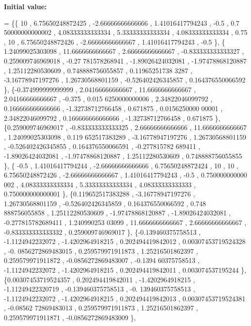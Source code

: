 {\bfseries Initial value\+:}
\begin{DoxyCode}
= \{\{               10 ,  6.75650248872425 , -2.66666666666666 ,  1.41016417794243 ,              -0.5 , 0.7
      50000000000002 ,  4.08333333333334 ,  5.33333333333334 ,  4.08333333333334 ,              0.75 ,            
          10 ,  6.75650248872426 , -2.66666666666667 ,  1.41016417794243 ,              -0.5 \},
\{ 1.24099025303098 ,  11.6666666666667 ,  2.66666666666667 , -0.833333333333327 , 0.259009746969018 , -0.27
      781578268941 , -1.89026424032081 , -1.97478868120887 ,  1.25112280530609 , 0.748888756055857 , 0.11965251738
      3287 , -3.16778947197276 ,  1.26730568801159 , -0.526402426345857 , 0.164376550066592 \},
\{-0.374999999999999 ,  2.04166666666667 ,  11.6666666666667 ,  2.04166666666667 ,            -0.375 , 0.015
      6250000000006 ,  2.34822046099792 , 0.166666666666666 , -1.32738712766458 ,          0.671875 , 0.0156250000
      00001 ,  2.34822046099792 , 0.166666666666666 , -1.32738712766458 ,          0.671875 \},
\{0.259009746969017 , -0.833333333333325 ,  2.66666666666666 ,  11.6666666666667 ,  1.24099025303098 , 0.119
      652517383289 , -3.16778947197276 ,  1.26730568801159 , -0.526402426345855 , 0.164376550066591 , -0.277815782
      689411 , -1.89026424032081 , -1.97478868120887 ,  1.25112280530609 , 0.748888756055855 \},
\{             -0.5 ,  1.41016417794244 , -2.66666666666666 ,  6.75650248872424 ,                10 ,       
               10 ,  6.75650248872426 , -2.66666666666667 ,  1.41016417794243 ,              -0.5 , 0.750000000000
      002 ,  4.08333333333334 ,  5.33333333333334 ,  4.08333333333333 , 0.750000000000001 \},
\{0.119652517383288 , -3.16778947197276 ,  1.26730568801159 , -0.526402426345859 , 0.164376550066592 , 0.748
      888756055858 ,  1.25112280530609 , -1.97478868120887 , -1.89026424032081 , -0.277815782689411 ,  1.240990253
      03099 ,  11.6666666666667 ,  2.66666666666667 , -0.833333333333332 , 0.259009746969017 \},
\{-0.139460375758513 ,  -1.1124942232072 ,  -1.4202964918215 , 0.202494419842012 , 0.00307453719524328 , -0.
      0856272869483015 , 0.259579971911873 ,  1.25216501862397 , 0.259579971911872 , -0.0856272869483007 , -0.1394
      60375758513 ,  -1.1124942232072 ,  -1.4202964918215 , 0.202494419842011 , 0.003074537195244 \},
\{0.00307453719524357 , 0.202494419842011 ,  -1.4202964918215 , -1.11249422320719 , -0.139460375758513 , -0.
      139460375758513 ,  -1.1124942232072 ,  -1.4202964918215 , 0.202494419842013 , 0.00307453719524381 , -0.08562
      72869483013 , 0.259579971911873 ,  1.25216501862397 , 0.259579971911871 , -0.0856272869483009 \},

\end{DoxyCode}
